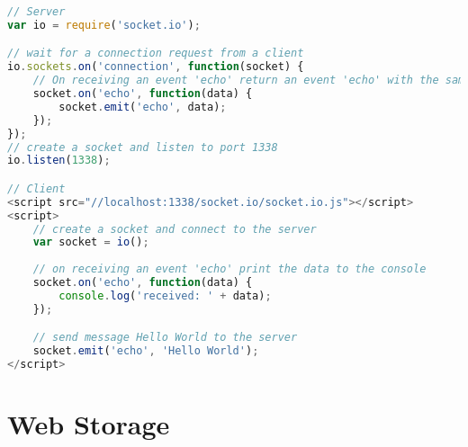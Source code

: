 \begin{lstlisting}[language=Javascript, caption=Websocket node.js, label=lst:websocket-node]
// Server
var io = require('socket.io');

// wait for a connection request from a client
io.sockets.on('connection', function(socket) {
	// On receiving an event 'echo' return an event 'echo' with the same data
	socket.on('echo', function(data) {
		socket.emit('echo', data);
	});
});
// create a socket and listen to port 1338
io.listen(1338);

// Client
<script src="//localhost:1338/socket.io/socket.io.js"></script>
<script>
	// create a socket and connect to the server
	var socket = io();
	
	// on receiving an event 'echo' print the data to the console
	socket.on('echo', function(data) {
		console.log('received: ' + data);
	});

	// send message Hello World to the server
	socket.emit('echo', 'Hello World');
</script>
\end{lstlisting}

\section{Web Storage}

